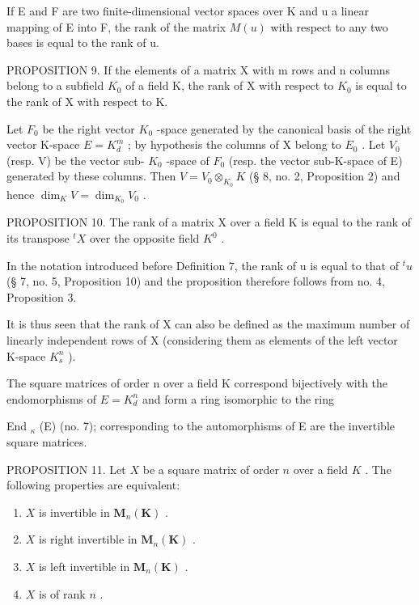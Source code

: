If E and F are two finite-dimensional vector spaces over K and u a linear mapping of E into F, the rank of the matrix \(M(u)\) with respect to any two bases is equal to the rank of u.

PROPOSITION 9. If the elements of a matrix X with m rows and n columns belong to a subfield \(K_{0}\) of a field K, the rank of X with respect to \(K_{0}\) is equal to the rank of X with respect to K.

Let \(F_{0}\) be the right vector \(K_{0}\) -space generated by the canonical basis of the right vector K-space \(E = K_{d}^{m}\) ; by hypothesis the columns of X belong to \(E_{0}\) . Let \(V_{0}\) (resp. V) be the vector sub- \(K_{0}\) -space of \(F_{0}\) (resp. the vector sub-K-space of E) generated by these columns. Then \(V = V_{0} \otimes_{K_{0}} K\) (§ 8, no. 2, Proposition 2) and hence \(\dim_{K} V = \dim_{K_{0}} V_{0}\) .

PROPOSITION 10. The rank of a matrix X over a field K is equal to the rank of its transpose \(^{t}X\) over the opposite field \(K^{0}\) .

In the notation introduced before Definition 7, the rank of u is equal to that of \({}^{t}u\) (§ 7, no. 5, Proposition 10) and the proposition therefore follows from no. 4, Proposition 3.

It is thus seen that the rank of X can also be defined as the maximum number of linearly independent rows of X (considering them as elements of the left vector K-space \(K_{s}^{n}\) ).

The square matrices of order n over a field K correspond bijectively with the endomorphisms of \(E = K_{d}^{n}\) and form a ring isomorphic to the ring

End \(_{\kappa}\) (E) (no. 7); corresponding to the automorphisms of E are the invertible square matrices.

PROPOSITION 11. Let \(X\) be a square matrix of order \(n\) over a field \(K\) . The following properties are equivalent:

\begin{enumerate}
\def\labelenumi{(\alph{enumi})}
\item
  \(X\) is invertible in \(\mathbf{M}_n(\mathbf{K})\) .
\item
  \(X\) is right invertible in \(\mathbf{M}_n(\mathbf{K})\) .
\item
  \(X\) is left invertible in \(\mathbf{M}_n(\mathbf{K})\) .
\item
  \(X\) is of rank \(n\) .
\end{enumerate}

